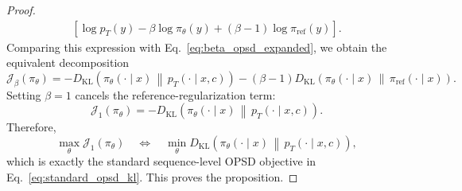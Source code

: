 \begin{proof}
\begin{align}
    \left[
    \log p_T(y)
    -
    \beta \log \pi_\theta(y)
    +
    (\beta-1)\log \pi_{\mathrm{ref}}(y)
    \right].
\end{align}
Comparing this expression with Eq.~\ref{eq:beta_opsd_expanded}, we obtain the equivalent
decomposition
\begin{equation}
    \mathcal{J}_{\beta}(\pi_\theta)
    =
    -
    D_{\mathrm{KL}}
    \left(
    \pi_\theta(\cdot\mid x)
    \,\middle\|\,
    p_T(\cdot\mid x,c)
    \right)
    -
    (\beta-1)
    D_{\mathrm{KL}}
    \left(
    \pi_\theta(\cdot\mid x)
    \,\middle\|\,
    \pi_{\mathrm{ref}}(\cdot\mid x)
    \right).
    \label{eq:beta_opsd_decomposition}
\end{equation}
Setting $\beta=1$ cancels the reference-regularization term:
\begin{equation}
    \mathcal{J}_{1}(\pi_\theta)
    =
    -
    D_{\mathrm{KL}}
    \left(
    \pi_\theta(\cdot\mid x)
    \,\middle\|\,
    p_T(\cdot\mid x,c)
    \right).
\end{equation}
Therefore,
\begin{equation}
    \max_{\theta}\mathcal{J}_{1}(\pi_\theta)
    \quad
    \Longleftrightarrow
    \quad
    \min_{\theta}
    D_{\mathrm{KL}}
    \left(
    \pi_\theta(\cdot\mid x)
    \,\middle\|\,
    p_T(\cdot\mid x,c)
    \right),
\end{equation}
which is exactly the standard sequence-level OPSD objective in
Eq.~\ref{eq:standard_opsd_kl}. This proves the proposition.
\end{proof}

